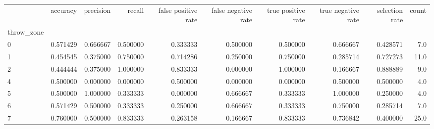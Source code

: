 \begin{tabular}{lrrrrrrrrr}
\toprule
{} &  accuracy &  precision &    recall &  false positive rate &  false negative rate &  true positive rate &  true negative rate &  selection rate &  count \\
throw\_zone &           &            &           &                      &                      &                     &                     &                 &        \\
\midrule
0          &  0.571429 &   0.666667 &  0.500000 &             0.333333 &             0.500000 &            0.500000 &            0.666667 &        0.428571 &    7.0 \\
1          &  0.454545 &   0.375000 &  0.750000 &             0.714286 &             0.250000 &            0.750000 &            0.285714 &        0.727273 &   11.0 \\
2          &  0.444444 &   0.375000 &  1.000000 &             0.833333 &             0.000000 &            1.000000 &            0.166667 &        0.888889 &    9.0 \\
4          &  0.500000 &   0.000000 &  0.000000 &             0.500000 &             0.000000 &            0.000000 &            0.500000 &        0.500000 &    4.0 \\
5          &  0.500000 &   1.000000 &  0.333333 &             0.000000 &             0.666667 &            0.333333 &            1.000000 &        0.250000 &    4.0 \\
6          &  0.571429 &   0.500000 &  0.333333 &             0.250000 &             0.666667 &            0.333333 &            0.750000 &        0.285714 &    7.0 \\
7          &  0.760000 &   0.500000 &  0.833333 &             0.263158 &             0.166667 &            0.833333 &            0.736842 &        0.400000 &   25.0 \\
\bottomrule
\end{tabular}
